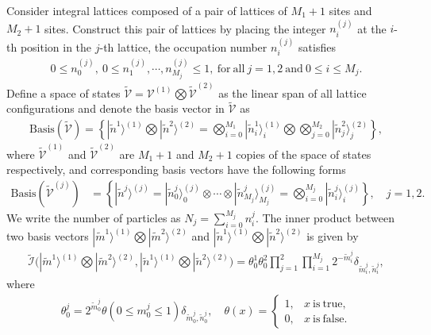 \documentclass[11pt,reqno]{amsart}
\numberwithin{equation}{section}
\begin{document}
	Consider integral lattices composed of a pair of lattices
	of $M_1+1$ sites and $M_2+1$ sites. Construct this pair of lattices by placing the integer $n_i^{(j)}$ at the $i$-th position in the $j$-th lattice,  the occupation number $n_i^{(j)}$  satisfies
	\begin{align}
		0 \le n_0^{(j)},  ~    0 \le n_1^{(j)},\cdots,  n_{M_j}^{(j)} \le 1, \mathrm{~for~all~} j=1,2  \mathrm{~and~}   0 \leq i \leq M_j .
	\end{align}
	Define a space of states  $\tilde{\mathcal{V}}=\mathcal{V}^{(1)}\bigotimes	\tilde{\mathcal{V}}^{(2)}$
	as the linear span of all lattice configurations and denote the basis vector in $\tilde{\mathcal{V}}$ as
	\begin{align}
		\text{Basis}(\tilde{\mathcal{V}})
		=\left\{|\tilde{n}^{1}\rangle^{(1)}\bigotimes|\tilde{n}^{2}\rangle^{(2)}=	 \bigotimes_{i=0}^{M_{1}}|\tilde{n}^{1}_{i}\rangle_{i}^{(1)}\bigotimes\bigotimes_{j=0}^{M_{2}}|\tilde{n}^{2}_{j}\rangle_{j}^{(2)}  \right\},
	\end{align}
	where $\tilde{\mathcal{V}}^{(1)}$ and $\tilde{\mathcal{V}}^{(2)}$ are $M_1+1$  and $M_2+1$ copies of the  space of states respectively, and corresponding basis vectors have the following forms
	\begin{align}
		\text{Basis}	(\tilde{\mathcal{V}}^{(j)})&
		=\left\{|\tilde{n}^{j}\rangle^{(j)}=  |\tilde{n}_{0}^{j}\rangle_0^{(j)}\otimes\cdots\otimes|\tilde{n}_{M_j}^{j}\rangle_{M_j}^{(j)}                  =	 \bigotimes_{i=0}^{M_{j}}|\tilde{n}_{i}^{j} \rangle_{i}^{(j)} \right\},\quad j=1,2.
	\end{align}
	We write the number of particles as $N_j=\sum\limits_{i=0}^{M_j} n_i^j$.
	The inner product between two basis vectors $|\tilde{m}^{1}\rangle^{(1)}\bigotimes|\tilde{m}^{2}\rangle^{(2)}$ and $|\tilde{n}^{1}\rangle^{(1)}\bigotimes|\tilde{n}^{2}\rangle^{(2)}$ is given by
	\begin{align}\label{inner-product}
		\tilde{\mathcal{I}}
		\big(
		|\tilde{m}^{1} \rangle^{(1)}\bigotimes|\tilde{m}^{2}\rangle^{(2)}, |\tilde{n}^{1}\rangle^{(1)}\bigotimes|\tilde{n}^{2}\rangle^{(2)}
		\big)
		=\theta_0^{1}\theta_0^{2}\prod_{j=1}^{2}\prod_{i=1}^{M_j} 2^{-\tilde{m}_i^{j}}\delta_{\tilde{m}_i^j, \tilde{n}_i^j},
	\end{align}
	where
	\begin{align}
		\theta_0^{j}= 2^{\tilde{m}_0^{j}}\theta\left(0 \leq m_0^{j} \leq 1\right)\delta_{\tilde{m}_0^{j},\tilde{n}_0^{j}}, \quad
		\theta(x)=
		\left\{\begin{array}{ll}
			1, &  x~\mathrm{is~true},
			\\  0,&  x~\mathrm{is~false}.
		\end{array}
		\right.	
	\end{align}
	
\end{document}
